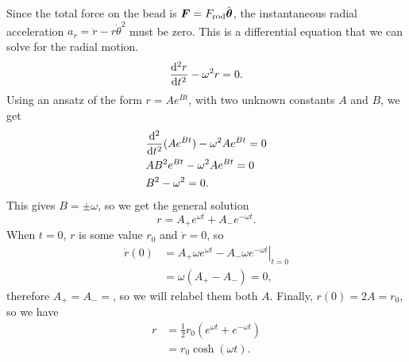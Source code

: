\documentclass[../classical_mechanics.tex]{subfiles}
\begin{document}
\begin{example}
            Since the total force on the bead is $\boldsymbol{F}=F_\text{rod}\hat{\boldsymbol{\theta}}$, the instantaneous radial acceleration $a_r=\ddot{r}-r\dot{\theta}^2$ must be zero.
            This is a differential equation that we can solve for the radial motion.
            \begin{equation}
                \dv[2]{r}{t}-\omega^2r=0.
            \end{equation}
            Using an ansatz of the form $r=Ae^{Bt}$, with two unknown constants $A$ and $B$, we get
            \begin{align}
                &\dv[2]{}{t}(Ae^{Bt})-\omega^2Ae^{Bt}=0\\
                &AB^2e^{Bt}-\omega^2Ae^{Bt}=0\\
                &B^2-\omega^2=0.
            \end{align}
            This gives $B=\pm\omega$, so we get the general solution
            \begin{equation}
                r=A_+e^{\omega t}+A_-e^{-\omega t}.
            \end{equation}
            When $t=0$, $r$ is some value $r_0$ and $\dot{r}=0$, so
            \begin{align}
                \dot{r}(0)&=\left.A_+\omega e^{\omega t}-A_-\omega e^{-\omega t}\right|_{t=0}\\
                &=\omega(A_+-A_-)=0,
            \end{align}
            therefore $A_+=A_-=$, so we will relabel them both $A$.
            Finally, $r(0)=2A=r_0$, so we have
            \begin{align}
                r&=\frac{1}{2}r_0(e^{\omega t}+e^{-\omega t})\\
                &=r_0\cosh(\omega t).
            \end{align}
        \end{example}
\end{document}
